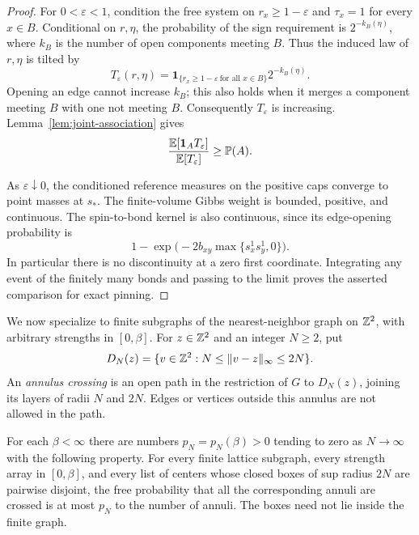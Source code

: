 \begin{proof}
For $0<\varepsilon<1$, condition the free system on
$r_x\geq1-\varepsilon$ and $\tau_x=1$ for every $x\in B$.
Conditional on $r,\eta$, the probability of the sign requirement is
$2^{-k_B(\eta)}$, where $k_B$ is the number of open components meeting
$B$.  Thus the induced law of $r,\eta$ is tilted by
\[
 T_\varepsilon(r,\eta)
 =\mathbf1_{\{r_x\geq1-\varepsilon\ \text{for all }x\in B\}}
       2^{-k_B(\eta)}.
\]
Opening an edge cannot increase $k_B$; this also holds when it merges
a component meeting $B$ with one not meeting $B$.  Consequently
$T_\varepsilon$ is increasing.  Lemma~\ref{lem:joint-association} gives
\[
 \frac{\mathbb E[\mathbf1_A T_\varepsilon]}{\mathbb E[T_\varepsilon]}
 \geq\mathbb P(A).
\]

As $\varepsilon\downarrow0$, the conditioned reference measures on
the positive caps converge to point masses at $s_*$.  The finite-volume
Gibbs weight is bounded, positive, and continuous.  The spin-to-bond
kernel is also continuous, since its edge-opening probability is
\[
 1-\exp\big(-2b_{xy}\max\{s_x^1s_y^1,0\}\big).
\]
In particular there is no discontinuity at a zero first coordinate.
Integrating any event of the finitely many bonds and passing to the
limit proves the asserted comparison for exact pinning.
\end{proof}

We now specialize to finite subgraphs of the nearest-neighbor graph
on $\mathbb Z^2$, with arbitrary strengths in $[0,\beta]$.  For $z\in\mathbb Z^2$
and an integer $N\geq2$, put
\[
 D_N(z)=\{v\in\mathbb Z^2:N\leq\|v-z\|_\infty\leq2N\}.
\]
An \emph{annulus crossing} is an open path in the restriction of $G$
to $D_N(z)$, joining its layers of radii $N$ and $2N$.
Edges or vertices outside this annulus are not allowed in the path.

\begin{proposition}\label{prop:crossings}
For each $\beta<\infty$ there are numbers $p_N=p_N(\beta)>0$ tending
to zero as $N\to\infty$ with the following property.  For every finite
lattice subgraph, every strength array in $[0,\beta]$, and every list
of centers whose closed boxes of sup radius $2N$ are pairwise disjoint,
the free probability that all the corresponding annuli are crossed
is at most $p_N$ to the number of annuli.  The boxes need not lie
inside the finite graph.
\end{proposition}

